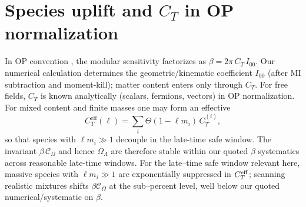 \documentclass[aps,prd,onecolumn,superscriptaddress,nofootinbib]{revtex4-2}
\begin{document}
\section{Species uplift and \(C_T\) in OP normalization}
\label{app:species}
In OP convention \cite{OsbornPetkou1994}, the modular sensitivity factorizes as \(\beta=2\pi\,C_T\,I_{00}\). Our numerical calculation determines the geometric/kinematic coefficient \(I_{00}\) (after MI subtraction and moment-kill); matter content enters only through \(C_T\). For free fields, \(C_T\) is known analytically (scalars, fermions, vectors) in OP normalization. For mixed content and finite masses one may form an effective
\[
C_T^{\mathrm{eff}}(\ell)=\sum_i \Theta(1-\ell m_i)\,C_T^{(i)},
\]
so that species with \(\ell m_i\gg 1\) decouple in the late-time safe window. The invariant \(\beta\,\mathcal C_\Omega\) and hence \(\Omega_\Lambda\) are therefore stable within our quoted \(\beta\) systematics across reasonable late-time windows. For the late–time safe window relevant here, massive species with $\ell m_i\gg 1$ are exponentially suppressed in $C_T^{\rm eff}$; scanning realistic mixtures shifts $\beta\mathcal C_\Omega$ at the sub–percent level, well below our quoted numerical/systematic on $\beta$.
\end{document}
